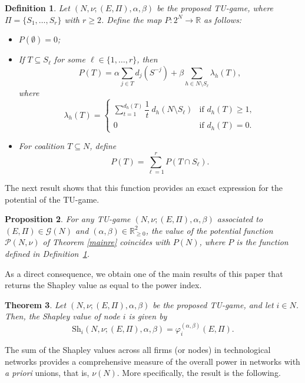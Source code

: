 \documentclass[preprint,11pt,authoryear]{elsarticle}
\newcommand{\dsum}{\displaystyle\sum}
\theoremstyle{plain}
\newtheorem{theorem}{Theorem}[]
\newtheorem{definition}[theorem]{Definition}
\newtheorem{proposition}[theorem]{Proposition}
\begin{document}
\begin{definition} \label{potential}
Let \( (N, \nu; (E, \Pi), \alpha, \beta) \) be the proposed TU-game, where \( \Pi = \{S_1, \dots, S_r\} \) with \( r \geq 2 \). Define the map \( P : 2^N \to \mathbb{R} \) as follows:
\begin{itemize}
    \item[-] \( P(\emptyset) = 0 \);
    \item[-] If \( T \subseteq S_\ell \) for some \( \ell \in \{1, \dots, r\} \), then
    \begin{equation} \label{kernel}
    P(T) = \alpha \sum_{j \in T} d_j(S^{-j}) + \beta \sum_{h \in N \setminus S_\ell} \lambda_h(T),
    \end{equation}
    where
    \begin{equation} \label{kernel1}
    \lambda_h(T) = 
    \begin{cases}
     \dsum_{t=1}^{d_h(T)} \dfrac{1}{t}\ d_h(N \setminus S_\ell)  & \text{if } d_h(T) \geq 1, \\
    0 & \text{if } d_h(T) = 0.
    \end{cases}
    \end{equation}
    \item[-] For coalition \( T \subseteq N \), define
    \begin{equation} \label{kernel2}
    P(T) = \sum_{\ell = 1}^{r} P(T \cap S_\ell).
    \end{equation}
\end{itemize}
\end{definition}
The next result shows that this function provides an exact expression for the potential of the TU-game.
\begin{proposition} \label{pot}
For any TU-game \( (N, \nu; (E, \Pi), \alpha, \beta) \) associated to $(E, \Pi)\in\mathcal{G}(N)$ and $(\alpha, \beta)\in\mathbb{R}_{\geq0}^2$, the value of the potential function \( \mathcal{P}(N, \nu) \) of Theorem \ref{mainre} coincides with \( P(N) \), where \( P \) is the function defined in Definition~\ref{potential}.
\end{proposition}
As a direct consequence, we obtain one of the main results of this paper that returns the Shapley value as equal to the power index.
\begin{theorem} \label{thmshapley}
Let \( (N, \nu; (E, \Pi), \alpha, \beta) \) be the proposed TU-game, and let \( i \in N \). Then, the Shapley value of node \( i \) is given by
\[
\mathrm{Sh}_i(N, \nu; (E, \Pi), \alpha, \beta)= \varphi_i^{(\alpha,\beta)}(E, \Pi).
\]
\end{theorem}
The sum of the Shapley values across all firms (or nodes) in technological networks provides a comprehensive measure of the overall power in networks with \emph{a priori} unions, that is, $\nu(N)$. More specifically, the result is the following.
\end{document}
